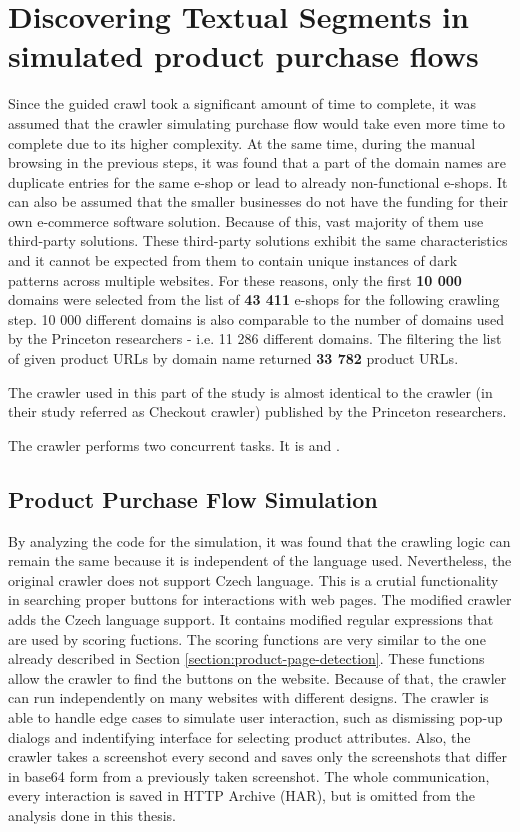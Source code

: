 \section{Discovering Textual Segments in simulated product purchase flows}
    Since the guided crawl took a significant amount of time to complete, it was assumed that the crawler simulating purchase flow would take even more time to complete due to its higher complexity. At the same time, during the manual browsing in the previous steps, it was found that a part of the domain names are duplicate entries for the same e-shop or lead to already non-functional e-shops. It can also be assumed that the smaller businesses do not have the funding for their own e-commerce software solution. Because of this, vast majority of them use third-party solutions. These third-party solutions exhibit the same characteristics and it cannot be expected from them to contain unique instances of dark patterns across multiple websites. For these reasons, only the first \textbf{10 000} domains were selected from the list of \textbf{43 411} e-shops for the following crawling step. 10 000 different domains is also comparable to the number of domains used by the Princeton researchers - i.e. 11 286 different domains. The filtering the list of given product URLs by domain name returned \textbf{33 782} product URLs.
    
    The crawler used in this part of the study is almost identical to the crawler (in their study referred as Checkout crawler) published by the Princeton researchers.

    The crawler performs two concurrent tasks. It is  and .

    \subsection{Product Purchase Flow Simulation}
    \label{section:flow-simulation}
    By analyzing the code for the simulation, it was found that the crawling logic can remain the same because it is independent of the language used. Nevertheless, the original crawler does not support Czech language. This is a crutial functionality in searching proper buttons for interactions with web pages. The modified crawler adds the Czech language support.
    It contains modified regular expressions that are used by scoring fuctions. The scoring functions are very similar to the one already described in Section \ref{section:product-page-detection}. These functions allow the crawler to find the buttons on the website. Because of that, the crawler can run independently on many websites with different designs. 
    The crawler is able to handle edge cases to simulate user interaction, such as dismissing pop-up dialogs and indentifying interface for selecting product attributes. Also, the crawler takes a screenshot every second and saves only the screenshots that differ in base64 form \cite{base64} from a previously taken screenshot. The whole communication, every interaction is saved in HTTP Archive (HAR), but is omitted from the analysis done in this thesis.
    
